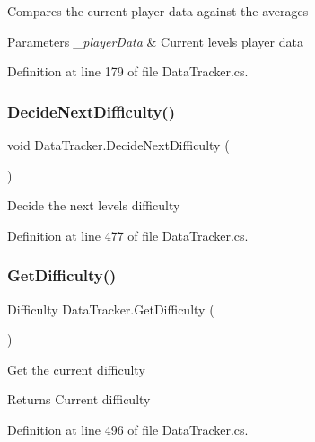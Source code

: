 Compares the current player data against the averages 


\begin{DoxyParams}{Parameters}
{\em \+\_\+player\+Data} & Current levels player data\\
\hline
\end{DoxyParams}


Definition at line 179 of file Data\+Tracker.\+cs.

\mbox{\label{class_data_tracker_a7b834b9df13c46f7dfa9b51e87e1c6c0}} 
\subsubsection{\texorpdfstring{Decide\+Next\+Difficulty()}{DecideNextDifficulty()}}
{\footnotesize\ttfamily void Data\+Tracker.\+Decide\+Next\+Difficulty (\begin{DoxyParamCaption}{ }\end{DoxyParamCaption})}



Decide the next level\textquotesingle{}s difficulty 



Definition at line 477 of file Data\+Tracker.\+cs.

\mbox{\label{class_data_tracker_aa31f9a357bd8db7116f0070b13f673d5}} 
\subsubsection{\texorpdfstring{Get\+Difficulty()}{GetDifficulty()}}
{\footnotesize\ttfamily Difficulty Data\+Tracker.\+Get\+Difficulty (\begin{DoxyParamCaption}{ }\end{DoxyParamCaption})}



Get the current difficulty 

\begin{DoxyReturn}{Returns}
Current difficulty
\end{DoxyReturn}


Definition at line 496 of file Data\+Tracker.\+cs.

